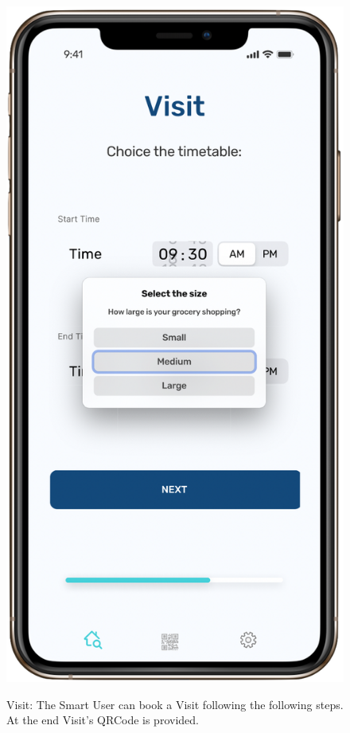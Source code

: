 \begin{figure}[H]
\begin{center}
{            \includegraphics[scale=0.30]{images/mockup/visit_size.png}
        }%
%
    \end{center}
    \caption{%
       Visit: The Smart User can book a Visit following the following steps. At the end Visit's QRCode is provided.
     }%
   \label{fig:subfigures}
\end{figure}



